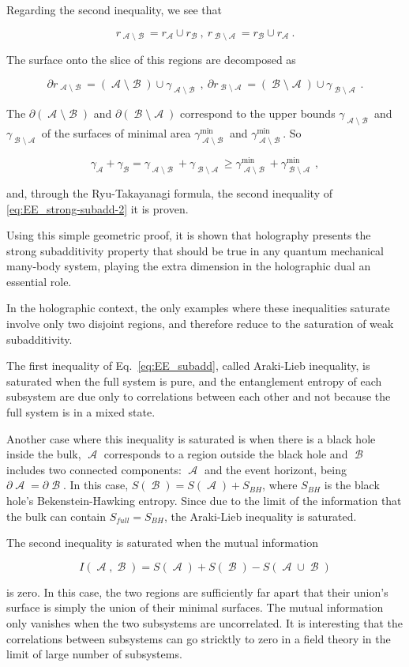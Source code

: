 \documentclass[twocolumn]{revtex4}
\providecommand{\eq}[2]{
    \begin{equation}
        #2
    \label{eq:#1}
    \end{equation}
}
\DeclareMathOperator{\calA}{\mathcal{A}}
\DeclareMathOperator{\calB}{\mathcal{B}}
\begin{document}
Regarding the second inequality, we see that
\eq{SS_r-2}{
    r_{\calA \setminus \calB} = r_{\calA} \cup r_{\calB} \ , \ r_{\calB \setminus \calA} = r_{\calB} \cup r_{\calA} \ .
}
The surface onto the slice of this regions are decomposed as
\eq{SS_dr-2}{
    \partial r_{\calA \setminus \calB} = (\calA \setminus \calB) \cup \gamma_{\calA \setminus \calB} \ , \ \partial r_{\calB \setminus \calA } = (\calB \setminus \calA) \cup \gamma_{\calB \setminus \calA} \ .
}
The $\partial (\calA \setminus \calB)$ and $\partial (\calB \setminus \calA)$ correspond to the upper bounds $\gamma_{\calA \setminus \calB}$ and $\gamma_{\calB \setminus \calA}$ of the surfaces of minimal area $\gamma^{\text{min}}_{\calA \setminus \calB}$ and $\gamma^{\text{min}}_{\calA \setminus \calB}$. So
\eq{SS_gamma-2}{
    \gamma_{\calA} + \gamma_{\calB} = \gamma_{\calA \setminus \calB} + \gamma_{\calB \setminus \calA} \ge \gamma^{\text{min}}_{\calA \setminus \calB} + \gamma^{\text{min}}_{\calB \setminus \calA} \ ,
}
and, through the Ryu-Takayanagi formula, the second inequality of \ref{eq:EE_strong-subadd-2} it is proven.

Using this simple geometric proof, it is shown that holography presents the strong subadditivity property that should be true in any quantum mechanical many-body system, playing the extra dimension in the holographic dual an essential role.

In the holographic context, the only examples where these inequalities saturate involve only two disjoint regions, and therefore reduce to the saturation of weak subadditivity.

The first inequality of Eq.~\ref{eq:EE_subadd}, called Araki-Lieb inequality, is saturated when the full system is pure, and the entanglement entropy of each subsystem are due only to correlations between each other and not because the full system is in a mixed state.

Another case where this inequality is saturated is when there is a black hole inside the bulk, $\calA$ corresponds to a region outside the black hole and $\calB$ includes two connected components: $\calA$ and the event horizont, being $\partial \calA = \partial \calB$. In this case, $S(\calB) = S(\calA) + S_{BH}$, where $S_{BH}$ is the black hole's Bekenstein-Hawking entropy. Since due to the limit of the information that the bulk can contain $S_{full} = S_{BH}$, the Araki-Lieb inequality is saturated.

The second inequality is saturated when the mutual information
\eq{Mutual-Info}{
    I(\calA,\calB) = S(\calA) + S(\calB) - S(\calA \cup \calB)
}
is zero. In this case, the two regions are sufficiently far apart that their union's surface is simply the union of their minimal surfaces. The mutual information only vanishes when the two subsystems are uncorrelated. It is interesting that the correlations between subsystems can go stricktly to zero in a field theory in the limit of large number of subsystems.
\end{document}
